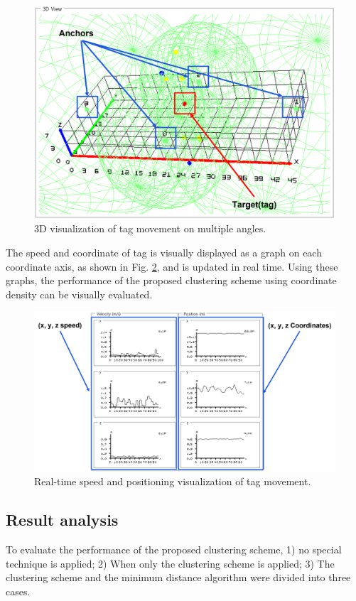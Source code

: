 \documentclass[conference]{IEEEtran}
\begin{document}
\begin{figure}[htbp]
    \centerline{\includegraphics[width=0.8\columnwidth]{fig8.png}}
    \caption{3D visualization of tag movement on multiple angles.}
    \label{fig9}
\end{figure}


The speed and coordinate of tag is visually displayed as a graph on each coordinate axis, as shown in Fig. \ref{fig10}, and is updated in real time. Using these graphs, the performance of the proposed clustering scheme using coordinate density can be visually evaluated.

\begin{figure}[htbp]
    \centerline{\includegraphics[width=1.0\columnwidth]{fig9.png}}
    \caption{Real-time speed and positioning visualization of tag movement.}
    \label{fig10}
\end{figure}


\subsection{Result analysis}
To evaluate the performance of the proposed clustering scheme, 1) no special technique is applied; 2) When only the clustering scheme is applied; 3) The clustering scheme and the minimum distance algorithm were divided into three cases.
\end{document}
